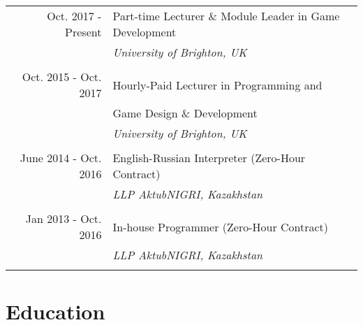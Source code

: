 \documentclass[a4paper,11pt]{article} %
\begin{document}
\begin{tabular}{r|p{11cm}}

Oct. 2017 - Present & Part-time Lecturer \& Module Leader in Game Development\\
& \emph{University of Brighton, UK}\\
\multicolumn{2}{c}{} \\


Oct. 2015 - Oct. 2017 & Hourly-Paid Lecturer in Programming and\\
& Game Design \& Development\\
& \emph{University of Brighton, UK}\\
\multicolumn{2}{c}{} \\


June 2014 - Oct. 2016 & English-Russian Interpreter (Zero-Hour Contract)\\
& \emph{LLP AktubNIGRI, Kazakhstan}\\
\multicolumn{2}{c}{} \\


Jan 2013 - Oct. 2016 & In-house Programmer (Zero-Hour Contract)\\
& \emph{LLP AktubNIGRI, Kazakhstan}\\
\multicolumn{2}{c}{} \\

\end{tabular}


\section{Education}
\end{document}
